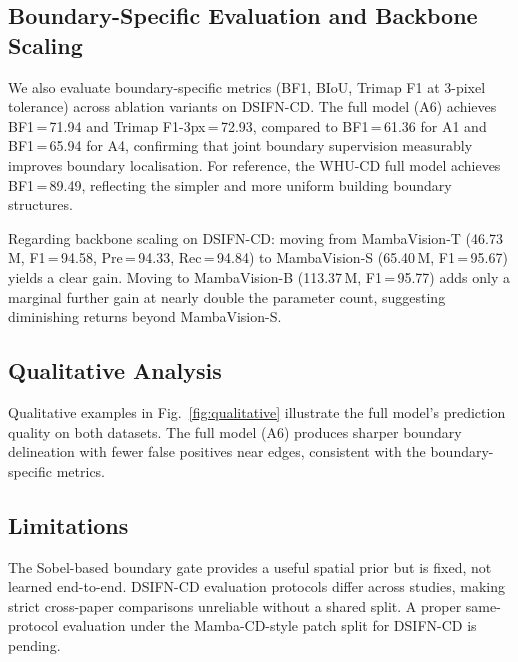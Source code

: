 

\subsection{Boundary-Specific Evaluation and Backbone Scaling}
\label{sec:boundary_scaling}
We also evaluate boundary-specific metrics (BF1, BIoU, Trimap F1 at 3-pixel tolerance) across ablation variants on DSIFN-CD. The full model (A6) achieves BF1\,=\,71.94 and Trimap F1-3px\,=\,72.93, compared to BF1\,=\,61.36 for A1 and BF1\,=\,65.94 for A4, confirming that joint boundary supervision measurably improves boundary localisation. For reference, the WHU-CD full model achieves BF1\,=\,89.49, reflecting the simpler and more uniform building boundary structures.

Regarding backbone scaling on DSIFN-CD: moving from MambaVision-T (46.73\,M, F1\,=\,94.58, Pre\,=\,94.33, Rec\,=\,94.84) to MambaVision-S (65.40\,M, F1\,=\,95.67) yields a clear gain. Moving to MambaVision-B (113.37\,M, F1\,=\,95.77) adds only a marginal further gain at nearly double the parameter count, suggesting diminishing returns beyond MambaVision-S.

\subsection{Qualitative Analysis}
\label{sec:qualitative}
Qualitative examples in Fig.~\ref{fig:qualitative} illustrate the full model's prediction quality on both datasets. The full model (A6) produces sharper boundary delineation with fewer false positives near edges, consistent with the boundary-specific metrics.



\subsection{Limitations}
\label{sec:limitations}
The Sobel-based boundary gate provides a useful spatial prior but is fixed, not learned end-to-end. DSIFN-CD evaluation protocols differ across studies, making strict cross-paper comparisons unreliable without a shared split. A proper same-protocol evaluation under the Mamba-CD-style patch split for DSIFN-CD is pending.
